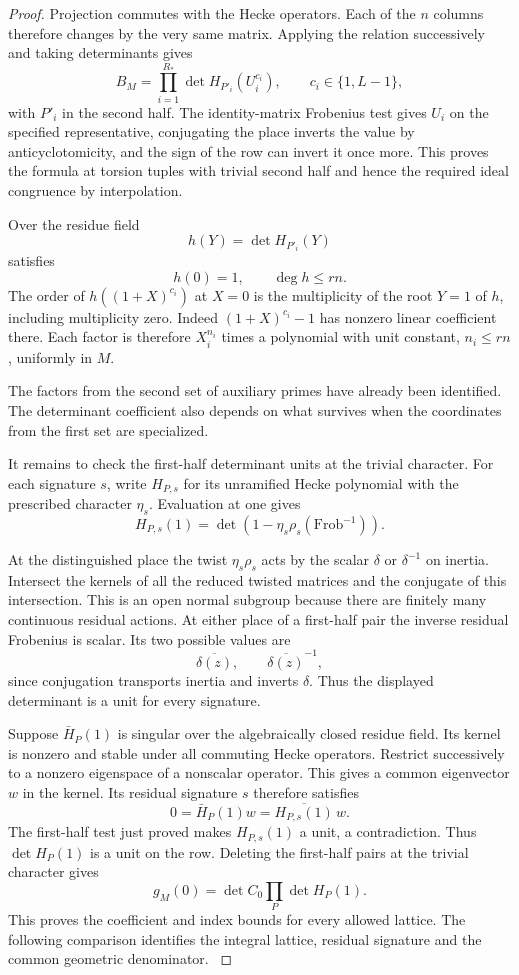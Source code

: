 \begin{proof}
Projection commutes with the
Hecke operators. Each of the \(n\) columns therefore changes
by the very same matrix. Applying the relation successively
and taking determinants gives
\[
 B_M=\prod_{i=1}^{R_*} \det H_{P'_i}(U_i^{c_i}),
       \qquad c_i\in\{1,L-1\},
\]
with \(P'_i\) in the second half. The identity-matrix
Frobenius test gives \(U_i\) on the specified representative,
conjugating the place inverts the value by anticyclotomicity,
and the sign of the row can invert it once more. This proves
the formula at torsion tuples with trivial second half and
hence the required ideal congruence by interpolation.

Over the residue field
\[
 h(Y)=\det H_{P'_i}(Y)
\]
satisfies
\[
 h(0)=1,\qquad\deg h\le rn.
\] The order of
\(h((1+X)^{c_i})\) at \(X=0\) is the multiplicity of the
root \(Y=1\) of \(h\), including multiplicity zero. Indeed
\((1+X)^{c_i}-1\) has nonzero linear coefficient there.
Each factor is therefore \(X_i^{n_i}\) times a polynomial
with unit constant, \(n_i\le rn\), uniformly in \(M\).

The factors from the second set of auxiliary primes have already been identified. The determinant coefficient also depends on what survives when the coordinates from the first set are specialized.

It remains to check the first-half determinant units at the
trivial character. For each signature \(s\), write \(H_{P,s}\) for its unramified Hecke polynomial with the prescribed character \(\eta_s\). Evaluation at one gives
\[
 H_{P,s}(1)=\det(1-\eta_s\rho_s(\mathrm{Frob}^{-1})).
\]

At the distinguished place the twist \(\eta_s\rho_s\)
acts by the scalar \(\delta\) or \(\delta^{-1}\) on inertia.
Intersect the kernels of all the reduced twisted matrices and
the conjugate of this intersection. This is an open normal
subgroup because there are finitely many continuous residual
actions. At either place of a first-half pair the inverse residual Frobenius is scalar. Its two possible values are
\[
 \overline{\delta(z)},\qquad \overline{\delta(z)}^{-1},
\]
since conjugation transports inertia and inverts \(\delta\). Thus the displayed determinant is a
unit for every signature.

Suppose \(\bar H_P(1)\) is singular over the algebraically
closed residue field. Its kernel is nonzero and stable under
all commuting Hecke operators. Restrict successively to a
nonzero eigenspace of a nonscalar operator. This gives a common
eigenvector \(w\) in the kernel. Its residual signature \(s\)
therefore satisfies
\[
       0=\bar H_P(1)w=\overline{H_{P,s}(1)}\,w .
\]
The first-half test just proved makes \(H_{P,s}(1)\) a unit,
a contradiction. Thus \(\det H_P(1)\) is a unit on the row.
Deleting the first-half pairs at the trivial character gives
\[
                   g_M(0)=\det C_0\prod_P\det H_P(1).
\]
This proves the coefficient and index bounds for every allowed
lattice. The following comparison identifies the integral lattice,
residual signature and the common geometric denominator.
\label{cor:twist-euler-2}
\end{proof}
